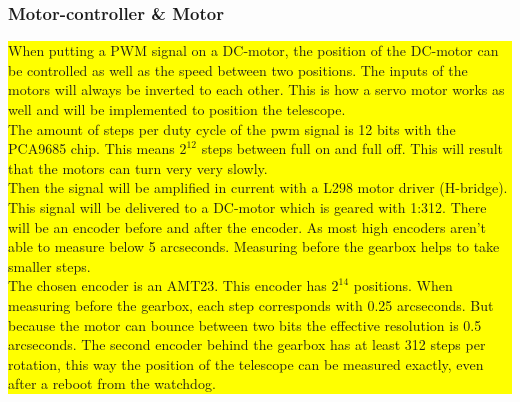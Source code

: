 \subsubsection{Motor-controller \& Motor}
\colorbox{yellow}{\parbox{\textwidth}{
When putting a PWM signal on a DC-motor, the position of the DC-motor can be controlled as well as the speed between two positions. The inputs of the motors will always be inverted to each other. This is how a servo motor works as well and will be implemented to position the telescope.\\

The amount of steps per duty cycle of the pwm signal is 12 bits with the PCA9685 chip. This means $2^{12}$ steps between full on and full off. This will result that the motors can turn very very slowly.\\

Then the signal will be amplified in current with a L298 motor driver (H-bridge). This signal will be delivered to a DC-motor which is geared with 1:312. There will be an encoder before and after the encoder. As most high encoders aren't able to measure below 5 arcseconds. Measuring before the gearbox helps to take smaller steps.\\

The chosen encoder is an AMT23. This encoder has $2^{14}$ positions. When measuring before the gearbox, each step corresponds with 0.25 arcseconds. But because the motor can bounce between two bits the effective resolution is 0.5 arcseconds. The second encoder behind the gearbox has at least 312 steps per rotation, this way the position of the telescope can be measured exactly, even after a reboot from the watchdog.
}}

